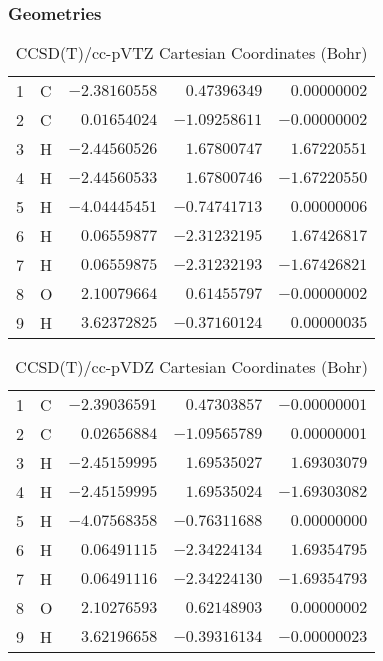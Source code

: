 \documentclass[10pt,oneside]{article}
\begin{document}
\clearpage

\subsection{\ \ \ }

\subsubsection*{Geometries}
\begin{table}[h!]
\centering
\caption{CCSD(T)/cc-pVTZ Cartesian Coordinates (Bohr)}
\begin{tabular}{llrrr}
1  & C  & $-2.38160558$ & $ 0.47396349$ & $ 0.00000002$ \\
2  & C  & $ 0.01654024$ & $-1.09258611$ & $-0.00000002$ \\
3  & H  & $-2.44560526$ & $ 1.67800747$ & $ 1.67220551$ \\
4  & H  & $-2.44560533$ & $ 1.67800746$ & $-1.67220550$ \\
5  & H  & $-4.04445451$ & $-0.74741713$ & $ 0.00000006$ \\
6  & H  & $ 0.06559877$ & $-2.31232195$ & $ 1.67426817$ \\
7  & H  & $ 0.06559875$ & $-2.31232193$ & $-1.67426821$ \\
8  & O  & $ 2.10079664$ & $ 0.61455797$ & $-0.00000002$ \\
9  & H  & $ 3.62372825$ & $-0.37160124$ & $ 0.00000035$ \\
\end{tabular}
\end{table}

\begin{table}[h!]
\centering
\caption{CCSD(T)/cc-pVDZ Cartesian Coordinates (Bohr)}
\begin{tabular}{llrrr}
1  & C  & $-2.39036591$ & $ 0.47303857$ & $-0.00000001$ \\
2  & C  & $ 0.02656884$ & $-1.09565789$ & $ 0.00000001$ \\
3  & H  & $-2.45159995$ & $ 1.69535027$ & $ 1.69303079$ \\
4  & H  & $-2.45159995$ & $ 1.69535024$ & $-1.69303082$ \\
5  & H  & $-4.07568358$ & $-0.76311688$ & $ 0.00000000$ \\
6  & H  & $ 0.06491115$ & $-2.34224134$ & $ 1.69354795$ \\
7  & H  & $ 0.06491116$ & $-2.34224130$ & $-1.69354793$ \\
8  & O  & $ 2.10276593$ & $ 0.62148903$ & $ 0.00000002$ \\
9  & H  & $ 3.62196658$ & $-0.39316134$ & $-0.00000023$ \\
\end{tabular}
\end{table}
\end{document}
